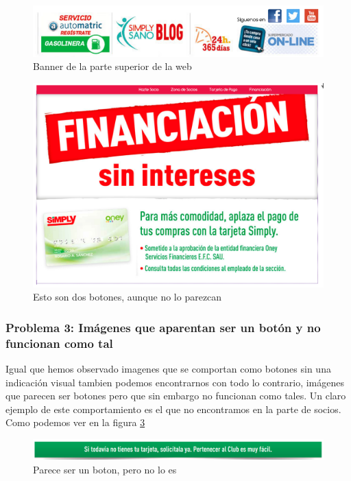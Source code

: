 \documentclass[a4paper,11pt]{article}
\begin{document}
\begin{figure}
 \centering
 \includegraphics[scale=0.5]{bannerarriba.png}
 \caption{Banner de la parte superior de la web}
 \label{fig:bannerarriba}
\end{figure}

\begin{figure}
 \centering
 \includegraphics[scale=0.5]{botoncamuflado.png}
 \caption{Esto son dos botones, aunque no lo parezcan}
 \label{fig:pagcomplbot}
\end{figure}

\subsubsection{Problema 3: Imágenes que aparentan ser un botón y no funcionan como tal}
Igual que hemos observado imagenes que se comportan como botones sin una indicación visual tambien podemos encontrarnos con todo lo contrario, imágenes que parecen ser botones pero que sin embargo no funcionan como tales. Un claro ejemplo de este comportamiento es el que no encontramos en la parte de socios. Como podemos ver en la figura \ref{fig:botonnoboton}

\begin{figure}
 \centering
 \includegraphics[scale=0.4]{botonquenoesboton.png}
 \caption{Parece ser un boton, pero no lo es}
 \label{fig:botonnoboton}
\end{figure}
\end{document}

